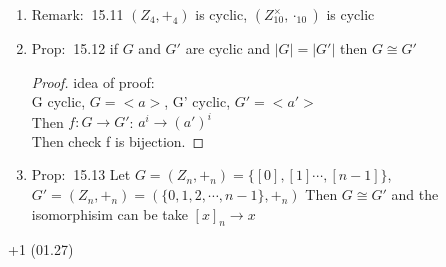 \documentclass[12pt]{article}
\newcommand{\prop}{{\color{blue} Prop: $\ $}}
\newcommand{\rem}{{\color{blue} Remark: $\ $}}
\begin{document}
\begin{enumerate}
\begin{enumerate}
        \item \rem 15.11 $(Z_4, +_4)$ is cyclic, $(Z_10^{\times}, \cdot_10)$ is cyclic
        \item \prop 15.12 if $G$ and $G'$ are cyclic and $|G| = |G'|$ then $G\cong G'$ 
        \begin{proof}
            idea of proof: \\
            G cyclic, $G = <a>$, G' cyclic, $G' =<a'>$ \\
            Then $f: G \rightarrow G'$: $a^i \rightarrow (a')^i$\\
            Then check f is bijection.
        \end{proof}
        \item \prop 15.13 Let $G = (Z_n, +_n) = \{[0], [1] \cdots, [n-1]\}$, $G' = (Z_n, +_n) = (\{0,1,2,\cdots, n-1\}, +_n)$
        Then $G\cong G'$ and the isomorphisim can be take $[x]_n \rightarrow x$

    \end{enumerate}


+1 (01.27)
\end{enumerate}
\end{document}
